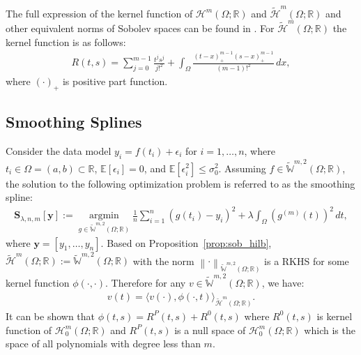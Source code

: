 \documentclass{article}
\newcommand{\norm}[1]{\left\lVert#1\right\rVert}
\newcommand{\sobeq}[2]{\widetilde{\mathbb{W}}^{#1,#2}\left(\Omega; \mathbb{R}\right)}
\newcommand{\hil}[1]{\mathcal{H}^{#1}\left(\Omega;\mathbb{R}\right)}
\newcommand{\hilz}[1]{\mathcal{H}_0^{#1}\left(\Omega;\mathbb{R}\right)}
\newcommand{\hiltilde}[1]{\widetilde{\mathcal{H}}^{#1}\left(\Omega;\mathbb{R}\right)}
\newcommand{\spline}{\mathbf{S}_{\lambda,n,m}}
\begin{document}
The full expression of the kernel function of $\hil{m}$ and $\hiltilde{m}$ and other equivalent norms of Sobolev spaces can be found in \citep[Section 4]{berlinet2011reproducing}. For $\hiltilde{m}$ the kernel function is as follows:
\begin{align}\label{eq:sob:kernel}
    R(t, s) = \sum_{j=0}^{m-1} \frac{t^j s^j}{j!^2}+\int_\Omega \frac{(t-x)_{+}^{m-1}(s-x)_{+}^{m-1}}{(m-1)!^2}\, dx,
\end{align}
where $(\cdot)_{+}$ is positive part function.
\subsection{Smoothing Splines}\label{app:smoothspline}
Consider the data model $y_i = f(t_i) + \epsilon_i$ for $i=1,\dots,n$, where $t_i \in \Omega=(a,b) \subset \mathbb{R}$, $\mathbb{E}[\epsilon_i] = 0$, and $\mathbb{E}[\epsilon_i^2] \leqslant \sigma_0^2$. 
Assuming $f\in \sobeq{m}{2}$, the solution to the following optimization problem is referred to as the smoothing spline:
\begin{align}\label{eq:sm_spline_obj}
    \spline[\mathbf{y}] :=\underset{g \in \sobeq{m}{2}}{\operatorname{argmin}} \frac{1}{n} \sum^n_{i=1}\left(g\left(t_i\right)-y_i\right)^2+\lambda \int_{\Omega} \left(g^{(m)}(t)\right)^2\,dt,
\end{align}
where $\mathbf{y} = [y_1,\dots, y_n]$. Based on Proposition~\ref{prop:sob_hilb}, $\hiltilde{m}:=\sobeq{m}{2}$ with the norm $\norm{\cdot}_{\sobeq{m}{2}}$ is a RKHS for some kernel function $\phi(\cdot,\cdot)$. Therefore for any $v \in \sobeq{m}{2}$, we have:
\begin{align}\label{eq:smothspline_kernel}
    v(t) = \langle v(\cdot), \phi(\cdot, t)\rangle_{\hiltilde{m}}.
\end{align}
It can be shown that $\phi(t,s) = R^P(t, s) + R^0(t,s)$ where $R^0(t, s)$ is kernel function of $\hilz{m}$ and $R^P(t,s)$ is a null space of $\hilz{m}$ which is the space of all polynomials with degree less than $m$.
\end{document}
